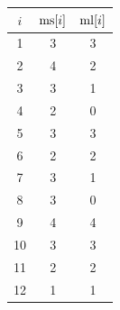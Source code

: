 \begin{tabular}{ccc}
  \hline
  $i$ & $\mathrm{ms}[i]$ & $\mathrm{ml}[i]$\\\hline
1 & 3 & 3\\
2 & 4 & 2\\
3 & 3 & 1\\
4 & 2 & 0\\
5 & 3 & 3\\
6 & 2 & 2\\
7 & 3 & 1\\
8 & 3 & 0\\
9 & 4 & 4\\
10 & 3 & 3\\
11 & 2 & 2\\
12 & 1 & 1\\
\hline
\end{tabular}
